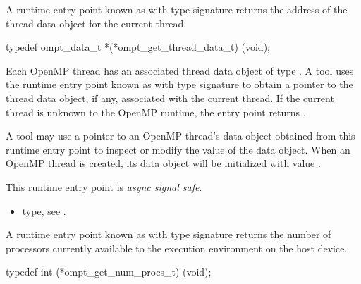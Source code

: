 \label{sec:ompt_get_thread_data_t}
\label{sec:ompt_get_thread_data}

\summary
A runtime entry point known as 
with type signature 
returns the address of the thread data object for the current thread.

\format
\begin{ccppspecific}
\begin{omptInquiry}
typedef ompt_data_t *(*ompt_get_thread_data_t) (void);
\end{omptInquiry}
\end{ccppspecific}

\descr

Each OpenMP thread has an associated thread data object of type
.
A tool uses the runtime entry point known as
with type signature 
to obtain a pointer to the thread data object, if any, associated with the
current thread. If the current thread is unknown to the OpenMP
runtime, the entry point returns .

A tool may use a pointer to an OpenMP thread's data object
obtained from this runtime entry point to
inspect or modify the value of the data object.
When an OpenMP thread is created, its data object will be initialized
with value .

This runtime entry point is \emph{async signal safe}.

\crossreferences
\begin{itemize}
\item {} type, see .
\end{itemize}


\label{sec:ompt_get_num_procs_t}

\summary

A runtime entry point known as
 with type signature
  returns
the number of processors currently available to the execution
environment on the host device.

\format

\begin{ccppspecific}
\begin{omptInquiry}
typedef int (*ompt_get_num_procs_t) (void);
\end{omptInquiry}
\end{ccppspecific}


